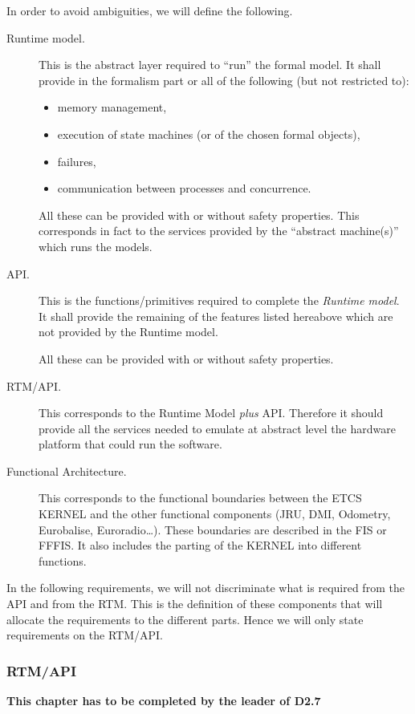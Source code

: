 \documentclass{template/openetcs_article}
\begin{document}
In order to avoid ambiguities, we will define the following.
\begin{description}
\item[Runtime model.] This is the abstract layer required to ``run'' the formal model. It shall provide
in the formalism part or all of the following (but not restricted to):
\begin{itemize}
\item memory management,
\item execution of state machines (or of the chosen formal objects), 
\item failures, 
\item communication between processes and concurrence. 
\end{itemize}
All these can be provided with or without safety properties. This corresponds in fact to the services 
provided by the ``abstract machine(s)'' which runs the models.
\item[API.]
 This is the functions/primitives required to complete the \emph{Runtime model}. It shall provide
the remaining of the features listed hereabove which are not provided by the Runtime model.

All these can be provided with or without safety properties.
\item[RTM/API.]
This corresponds to the Runtime Model \emph{plus} API. Therefore it should provide all the services
needed to emulate at abstract level the hardware platform that could run the software.
\item[Functional Architecture.] This corresponds to the functional boundaries between the ETCS KERNEL 
and the other functional components (JRU, DMI, Odometry, Eurobalise, Euroradio\dots). These boundaries
are described in the FIS or FFFIS. It also includes the parting of the KERNEL into different 
functions.
\end{description}

In the following requirements, we will not discriminate what is required from the API and from the 
RTM. This is the definition of these components that will allocate the requirements to the different 
parts. Hence we will only state requirements on the RTM/API.

\subsubsection{RTM/API}
\textbf{This chapter has to be completed by the leader of D2.7}

\end{document}
